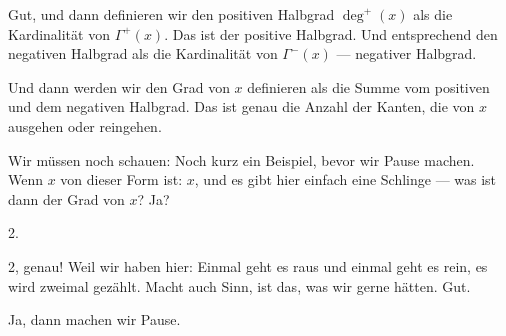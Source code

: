 \begin{math-stroke}
\end{math-stroke}

\begin{spoken-clean}[00:43:00 - 00:45:02]
Gut, und dann definieren wir den positiven Halbgrad $\operatorname{deg}^+(x)$ als die Kardinalität von $\Gamma^+(x)$. Das ist der positive Halbgrad. Und entsprechend den negativen Halbgrad als die Kardinalität von $\Gamma^-(x)$ --- negativer Halbgrad.

Und dann werden wir den Grad von $x$ definieren als die Summe vom positiven und dem negativen Halbgrad. Das ist genau die Anzahl der Kanten, die von $x$ ausgehen oder reingehen.

Wir müssen noch schauen: Noch kurz ein Beispiel, bevor wir Pause machen. Wenn $x$ von dieser Form ist: $x$, und es gibt hier einfach eine Schlinge --- was ist dann der Grad von $x$? Ja?
\end{spoken-clean}

\begin{student-interaction}[Studentenantwort]
2.
\end{student-interaction}

\begin{spoken-clean}[00:45:02 - 00:45:03]
2, genau! Weil wir haben hier: Einmal geht es raus und einmal geht es rein, es wird zweimal gezählt. Macht auch Sinn, ist das, was wir gerne hätten. Gut.

Ja, dann machen wir Pause.
\end{spoken-clean}

